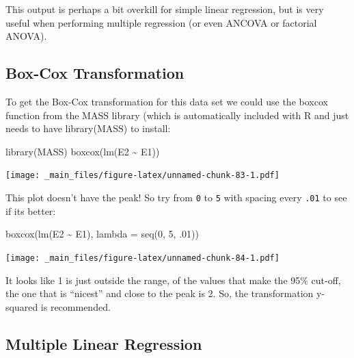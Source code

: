 \documentclass[
]{book}
\newenvironment{Shaded}{\begin{snugshade}}{\end{snugshade}}
\newcommand{\AttributeTok}[1]{\textcolor[rgb]{0.77,0.63,0.00}{#1}}
\newcommand{\DecValTok}[1]{\textcolor[rgb]{0.00,0.00,0.81}{#1}}
\newcommand{\FunctionTok}[1]{\textcolor[rgb]{0.00,0.00,0.00}{#1}}
\newcommand{\NormalTok}[1]{#1}
\newcommand{\SpecialCharTok}[1]{\textcolor[rgb]{0.00,0.00,0.00}{#1}}
\begin{document}
This output is perhaps a bit overkill for simple linear regression, but is very useful when performing multiple regression (or even ANCOVA or factorial ANOVA).

\hypertarget{box-cox-transformation}{%
\subsection{Box-Cox Transformation}\label{box-cox-transformation}}

To get the Box-Cox transformation for this data set we could use the boxcox function from the MASS library (which is automatically included with R and just needs to have library(MASS) to install:

\begin{Shaded}
\begin{Highlighting}[]
\FunctionTok{library}\NormalTok{(MASS)}
\FunctionTok{boxcox}\NormalTok{(}\FunctionTok{lm}\NormalTok{(E2 }\SpecialCharTok{\textasciitilde{}}\NormalTok{ E1))}
\end{Highlighting}
\end{Shaded}

\texttt{[image: \_main\_files/figure-latex/unnamed-chunk-83-1.pdf]}

This plot doesn't have the peak! So try from \texttt{0} to \texttt{5} with spacing every \texttt{.01} to see if its better:

\begin{Shaded}
\begin{Highlighting}[]
\FunctionTok{boxcox}\NormalTok{(}\FunctionTok{lm}\NormalTok{(E2 }\SpecialCharTok{\textasciitilde{}}\NormalTok{ E1), }\AttributeTok{lambda =} \FunctionTok{seq}\NormalTok{(}\DecValTok{0}\NormalTok{, }\DecValTok{5}\NormalTok{, .}\DecValTok{01}\NormalTok{))}
\end{Highlighting}
\end{Shaded}

\texttt{[image: \_main\_files/figure-latex/unnamed-chunk-84-1.pdf]}

It looks like 1 is just outside the range, of the values that make the 95\% cut-off, the one that is ``nicest'' and close to the peak is 2. So, the transformation y-squared is recommended.

\hypertarget{multiple-linear-regression}{%
\subsection{Multiple Linear Regression}\label{multiple-linear-regression}}
\end{document}
